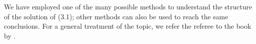 \documentclass[12pt]{report}   %
\newcommand{\Ndg}{\tilde{N}_g}
\begin{document}
% 
% 
We have employed one of the many possible methods to understand the structure of the solution of (3.1); other methods can also be used to reach the same conclusions.
For a general treatment of the topic, we refer the referee to the book by \cite{Hinch1991}. %

%
\clearpage{\pagestyle{empty}\cleardoublepage}

%

\nocite{*}

\begin{spacing}{0.9}
  
\end{spacing}
\end{document}
